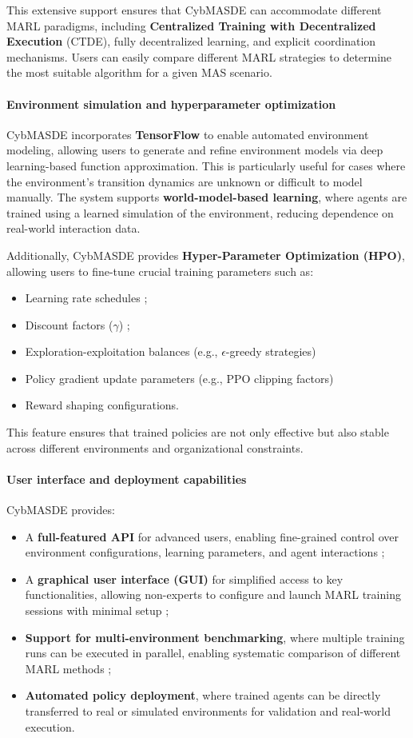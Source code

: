\documentclass[pdflatex,sn-mathphys-num]{sn-jnl}%
\theoremstyle{thmstyleone}%
\theoremstyle{thmstyletwo}%
\theoremstyle{thmstylethree}%
\begin{document}
This extensive support ensures that CybMASDE can accommodate different MARL paradigms, including \textbf{Centralized Training with Decentralized Execution} (CTDE), fully decentralized learning, and explicit coordination mechanisms. Users can easily compare different MARL strategies to determine the most suitable algorithm for a given MAS scenario.

\paragraph{Environment simulation and hyperparameter optimization} 
CybMASDE incorporates \textbf{TensorFlow} to enable automated environment modeling, allowing users to generate and refine environment models via deep learning-based function approximation. This is particularly useful for cases where the environment's transition dynamics are unknown or difficult to model manually. The system supports \textbf{world-model-based learning}, where agents are trained using a learned simulation of the environment, reducing dependence on real-world interaction data.

Additionally, CybMASDE provides \textbf{Hyper-Parameter Optimization (HPO)}, allowing users to fine-tune crucial training parameters such as:
\begin{itemize}
    \item Learning rate schedules ;
    \item Discount factors ($\gamma$) ;
    \item Exploration-exploitation balances (e.g., $\epsilon$-greedy strategies)
    \item Policy gradient update parameters (e.g., PPO clipping factors)
    \item Reward shaping configurations.
\end{itemize}

This feature ensures that trained policies are not only effective but also stable across different environments and organizational constraints.

\paragraph{User interface and deployment capabilities} 
CybMASDE provides:
\begin{itemize}
    \item A \textbf{full-featured API} for advanced users, enabling fine-grained control over environment configurations, learning parameters, and agent interactions ;
    \item A \textbf{graphical user interface (GUI)} for simplified access to key functionalities, allowing non-experts to configure and launch MARL training sessions with minimal setup ;
    \item \textbf{Support for multi-environment benchmarking}, where multiple training runs can be executed in parallel, enabling systematic comparison of different MARL methods ;
    \item \textbf{Automated policy deployment}, where trained agents can be directly transferred to real or simulated environments for validation and real-world execution.
\end{itemize}
\end{document}
